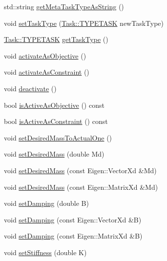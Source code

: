 \begin{DoxyCompactItemize}
\item 
std\+::string \hyperlink{classocra_1_1Task_a957707b86aa3fdc088040485ab9269ed}{get\+Meta\+Task\+Type\+As\+String} ()
\item 
void \hyperlink{classocra_1_1Task_a8292d37db712589e90d628d9b1e3e1ea}{set\+Task\+Type} (\hyperlink{classocra_1_1Task_ad9d224cf787aa61c098f282efb78254a}{Task\+::\+T\+Y\+P\+E\+T\+A\+SK} new\+Task\+Type)
\item 
\hyperlink{classocra_1_1Task_ad9d224cf787aa61c098f282efb78254a}{Task\+::\+T\+Y\+P\+E\+T\+A\+SK} \hyperlink{classocra_1_1Task_a1fed0d65711edfdc4b9e83c292b147f8}{get\+Task\+Type} ()
\item 
void \hyperlink{classocra_1_1Task_a30cf51c067e6bac56a7b2184fa880bbe}{activate\+As\+Objective} ()
\item 
void \hyperlink{classocra_1_1Task_a4f7b62e14ba71899991eaf4522d31a90}{activate\+As\+Constraint} ()
\item 
void \hyperlink{classocra_1_1Task_abb7309429225e72998ede63fdb2cc713}{deactivate} ()
\item 
bool \hyperlink{classocra_1_1Task_a50741879ff503fd58488b3a6ab2851ae}{is\+Active\+As\+Objective} () const 
\item 
bool \hyperlink{classocra_1_1Task_ae03b55196583e1bce931e54f536c0063}{is\+Active\+As\+Constraint} () const 
\item 
void \hyperlink{classocra_1_1Task_aa1b8236efcfba897ca6a684226a338ae}{set\+Desired\+Mass\+To\+Actual\+One} ()
\item 
void \hyperlink{classocra_1_1Task_a31055e4bfc91407ef5ed6f0d200afe77}{set\+Desired\+Mass} (double Md)
\item 
void \hyperlink{classocra_1_1Task_ad6a82a5166195be0080f7d33b628d9df}{set\+Desired\+Mass} (const Eigen\+::\+Vector\+Xd \&Md)
\item 
void \hyperlink{classocra_1_1Task_aa7a0800fcb7c9b7ea9d72de05efa4db7}{set\+Desired\+Mass} (const Eigen\+::\+Matrix\+Xd \&Md)
\item 
void \hyperlink{classocra_1_1Task_a51509c15751c0fc8c40bf4b2328d7b21}{set\+Damping} (double B)
\item 
void \hyperlink{classocra_1_1Task_ab5fd8e11eea7dbccb7169282c9be4b0a}{set\+Damping} (const Eigen\+::\+Vector\+Xd \&B)
\item 
void \hyperlink{classocra_1_1Task_a5dd04fe71a38907391b1b4885df2c86a}{set\+Damping} (const Eigen\+::\+Matrix\+Xd \&B)
\item 
void \hyperlink{classocra_1_1Task_a9b132099233731049473a54fc53a29ac}{set\+Stiffness} (double K)

\end{DoxyCompactItemize}
